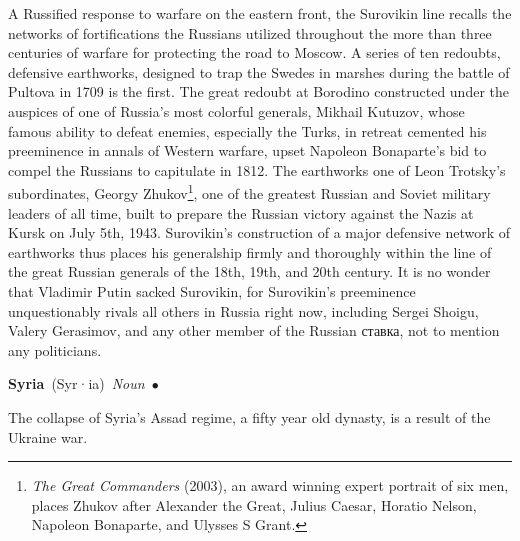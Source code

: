 \documentclass[10pt,a4paper,twoside]{article} %
\newcommand{\entry}[4]{\markboth{#1}{#1}\textbf{#1}\ {(#2)}\ \textit{#3}\ $\bullet$\ {#4}}  %
\begin{document}
\begin{multicols}{2}
{\newline \indent A Russified response to warfare on the eastern front, the Surovikin line recalls the networks of fortifications the Russians utilized throughout the more than three centuries of warfare for protecting the road to Moscow. A series of ten  redoubts, defensive earthworks, designed to trap the Swedes in marshes during the battle of Pultova in 1709 is the first. The great redoubt at Borodino constructed under the auspices of one of Russia's most colorful generals, Mikhail Kutuzov, whose famous ability to defeat enemies, especially the Turks, in retreat cemented his preeminence in annals of Western warfare, upset Napoleon Bonaparte's bid to compel the Russians to capitulate in 1812. The earthworks one of Leon Trotsky's subordinates, Georgy Zhukov\footnote{\emph{The Great Commanders} (2003), an award winning expert portrait of six men, places Zhukov after Alexander the Great, Julius Caesar, Horatio Nelson, Napoleon Bonaparte, and Ulysses S Grant.}, one of the greatest Russian and Soviet military leaders of all time, built to prepare the Russian victory against the Nazis at Kursk on July 5th, 1943. Surovikin's construction of a major defensive network of earthworks thus places his generalship firmly and thoroughly within the line of the great Russian generals of the 18th, 19th, and 20th century. It is no wonder that Vladimir Putin sacked Surovikin, for Surovikin's preeminence unquestionably rivals all others in Russia right now, including Sergei Shoigu, Valery Gerasimov, and any other member of the Russian \textrussian{ставка}, not to mention any politicians. 

}

\entry{Syria} {Syr·ia} {Noun} {
The collapse of Syria's Assad regime, a fifty year old dynasty, is a result of the Ukraine war. 

}


\end{multicols}
\end{document}
